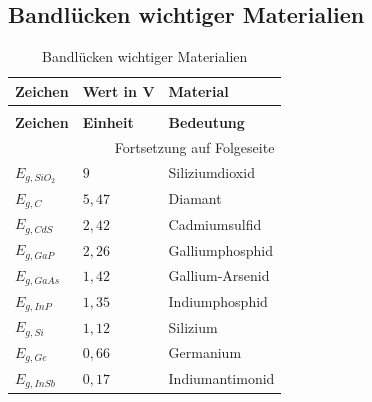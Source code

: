 \documentclass[12pt,a4paper]{report}%
\numberwithin{equation}{section}
\numberwithin{equation}{subsection}
\begin{document}
	\subsection{Bandlücken wichtiger Materialien} \label{ch:gaps}
	\renewcommand{\arraystretch}{1.5}
	\begin{longtable} {|p{2cm}|p{3cm}|p{8.4cm}|} \hline
	\textbf{Zeichen} & \textbf{Wert in \text{e}V} & \textbf{Material} \\
	\hline
	\endfirsthead %
	\caption{Bandlücken wichtiger Materialien}\\ \hline
	\textbf{Zeichen} & \textbf{Einheit} & \textbf{Bedeutung} \\
	\hline
	\endhead %
	\multicolumn{3}{r}{Fortsetzung auf Folgeseite}\\
	\endfoot
	\hline
	\endlastfoot
	$E_{g,SiO_2}$ & $9$ & Siliziumdioxid \\ \hline
	$E_{g,C}$ & $5,47$ & Diamant \\ \hline
	$E_{g,CdS}$ & $2,42$ & Cadmiumsulfid \\ \hline
	$E_{g,GaP}$ & $2,26$ & Galliumphosphid \\ \hline
	$E_{g,GaAs}$ & $1,42$ & Gallium-Arsenid \\ \hline
	$E_{g,InP}$ & $1,35$ & Indiumphosphid \\ \hline
	$E_{g,Si}$ & $1,12$ & Silizium \\ \hline
	$E_{g,Ge}$ & $0,66$ & Germanium \\ \hline
	$E_{g,InSb}$ & $0,17$ & Indiumantimonid \\ \hline
	\end{longtable}
	\renewcommand{\arraystretch}{1}
	
\end{document}
